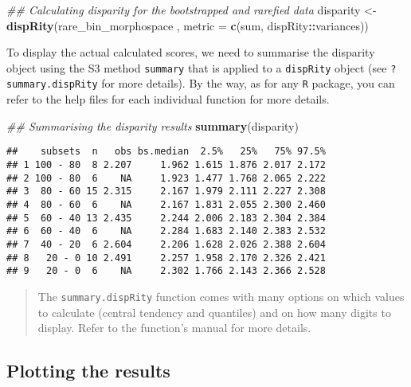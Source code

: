 \documentclass[
]{book}
\newenvironment{Shaded}{\begin{snugshade}}{\end{snugshade}}
\newcommand{\CommentTok}[1]{\textcolor[rgb]{0.56,0.35,0.01}{\textit{#1}}}
\newcommand{\DataTypeTok}[1]{\textcolor[rgb]{0.13,0.29,0.53}{#1}}
\newcommand{\KeywordTok}[1]{\textcolor[rgb]{0.13,0.29,0.53}{\textbf{#1}}}
\newcommand{\NormalTok}[1]{#1}
\newcommand{\OperatorTok}[1]{\textcolor[rgb]{0.81,0.36,0.00}{\textbf{#1}}}
\newcommand{\StringTok}[1]{\textcolor[rgb]{0.31,0.60,0.02}{#1}}
\begin{document}
\begin{Shaded}
\begin{Highlighting}[]
\CommentTok{\#\# Calculating disparity for the bootstrapped and rarefied data}
\NormalTok{disparity \textless{}{-}}\StringTok{ }\KeywordTok{dispRity}\NormalTok{(rare\_bin\_morphospace , }\DataTypeTok{metric =} \KeywordTok{c}\NormalTok{(sum, dispRity}\OperatorTok{::}\NormalTok{variances))}
\end{Highlighting}
\end{Shaded}

To display the actual calculated scores, we need to summarise the disparity object using the S3 method \texttt{summary} that is applied to a \texttt{dispRity} object (see \texttt{?summary.dispRity} for more details).
By the way, as for any \texttt{R} package, you can refer to the help files for each individual function for more details.

\begin{Shaded}
\begin{Highlighting}[]
\CommentTok{\#\# Summarising the disparity results}
\KeywordTok{summary}\NormalTok{(disparity)}
\end{Highlighting}
\end{Shaded}

\begin{verbatim}
##    subsets  n   obs bs.median  2.5%   25%   75% 97.5%
## 1 100 - 80  8 2.207     1.962 1.615 1.876 2.017 2.172
## 2 100 - 80  6    NA     1.923 1.477 1.768 2.065 2.222
## 3  80 - 60 15 2.315     2.167 1.979 2.111 2.227 2.308
## 4  80 - 60  6    NA     2.167 1.831 2.055 2.300 2.460
## 5  60 - 40 13 2.435     2.244 2.006 2.183 2.304 2.384
## 6  60 - 40  6    NA     2.284 1.683 2.140 2.383 2.532
## 7  40 - 20  6 2.604     2.206 1.628 2.026 2.388 2.604
## 8   20 - 0 10 2.491     2.257 1.958 2.170 2.326 2.421
## 9   20 - 0  6    NA     2.302 1.766 2.143 2.366 2.528
\end{verbatim}

\begin{quote}
The \texttt{summary.dispRity} function comes with many options on which values to calculate (central tendency and quantiles) and on how many digits to display. Refer to the function's manual for more details.
\end{quote}

\hypertarget{plotting-the-results}{%
\subsection{Plotting the results}\label{plotting-the-results}}
\end{document}
